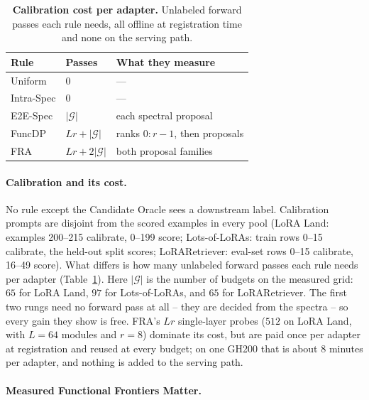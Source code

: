 \documentclass{article}
\begin{document}
\begin{table}
	\vspace{-1.2\baselineskip}
	\centering
	\captionsetup{font=footnotesize}
	\caption{\textbf{Calibration cost per adapter.} Unlabeled forward passes each
		rule needs, all offline at registration time and none on the serving path.}
	\label{tab:cost}
	\footnotesize
	\setlength{\tabcolsep}{4pt}\renewcommand{\arraystretch}{0.95}
	\begin{tabular}{@{}lll@{}}
		\toprule
		Rule & Passes & What they measure \\
		\midrule
		Uniform & $0$ & --- \\
		Intra-Spec & $0$ & --- \\
		E2E-Spec & $|\mathcal{G}|$ & each spectral proposal \\
		FuncDP & $Lr+|\mathcal{G}|$ & ranks $0{:}r{-}1$, then proposals \\
		FRA & $Lr+2|\mathcal{G}|$ & both proposal families \\
		\bottomrule
	\end{tabular}
	\vspace{-0.6\baselineskip}
\end{table}

\paragraph{Calibration and its cost.} No rule except the Candidate Oracle sees a
downstream label.
Calibration prompts are disjoint from the scored examples in every pool
(LoRA Land: examples 200--215 calibrate, 0--199 score; Lots-of-LoRAs: train rows
0--15 calibrate, the held-out split scores; LoRARetriever: eval-set rows 0--15
calibrate, 16--49 score). What differs is how many unlabeled forward passes each
rule needs per adapter (Table~\ref{tab:cost}).
Here $|\mathcal{G}|$ is the number of budgets on the measured grid: $65$
for LoRA Land, $97$ for Lots-of-LoRAs, and $65$ for LoRARetriever. The first two rungs
need no forward pass at all -- they are decided from the spectra -- so every gain
they show is free. FRA's $Lr$ single-layer probes ($512$ on LoRA Land, with
$L{=}64$ modules and $r{=}8$) dominate its cost, but are paid once per adapter at
registration and reused at every budget; on one GH200 that is about $8$ minutes
per adapter, and nothing is added to the serving path.

\paragraph{Measured Functional Frontiers Matter.}
\label{sec:measured-frontiers}
\end{document}
